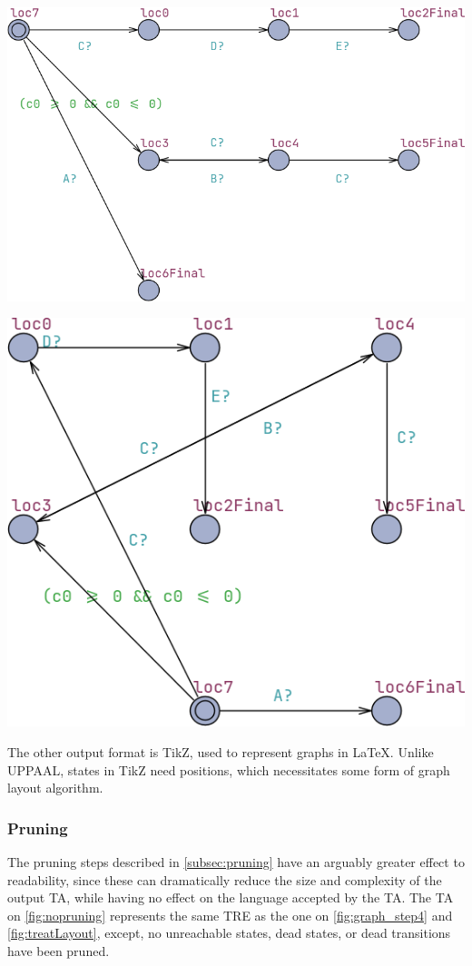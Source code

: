 \vspace{0.75em}
\begin{center}
    \includegraphics[width=0.8\columnwidth]{Documents/Diagrams/ReadabilityFigures/treat.png}
    \label{fig:uppaalLayout}
    \vspace{0.75em}

    \includegraphics[width=0.6\columnwidth]{Documents/Diagrams/ReadabilityFigures/uppaal.png}
    \label{fig:treatLayout}
\end{center}
\vspace{0.75em}

The other output format is TikZ, used to represent graphs in LaTeX. Unlike UPPAAL, states in TikZ need positions, which necessitates some form of graph layout algorithm.

\subsubsection{Pruning}

The pruning steps described in \cref{subsec:pruning} have an arguably greater effect to readability, since these can dramatically reduce the size and complexity of the output TA, while having no effect on the language accepted by the TA.
The TA on \cref{fig:nopruning} represents the same TRE as the one on \cref{fig:graph_step4} and \cref{fig:treatLayout}, except, no unreachable states, dead states, or dead transitions have been pruned.

